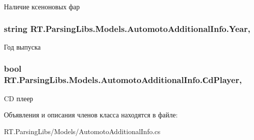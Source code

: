 Наличие ксеноновых фар 

\hypertarget{class_r_t_1_1_parsing_libs_1_1_models_1_1_automoto_additional_info_ae0f5daa4045a2596ba9836508e58fb6d}{
\subsubsection[{Year}]{\setlength{\rightskip}{0pt plus 5cm}string R\+T.\+Parsing\+Libs.\+Models.\+Automoto\+Additional\+Info.\+Year\hspace{0.3cm}{\ttfamily [get]}, {\ttfamily [set]}}}\label{class_r_t_1_1_parsing_libs_1_1_models_1_1_automoto_additional_info_ae0f5daa4045a2596ba9836508e58fb6d}


Год выпуска 

\hypertarget{class_r_t_1_1_parsing_libs_1_1_models_1_1_automoto_additional_info_a17c1ad5fc22043afccdf88454c171807}{
\subsubsection[{Сd\+Player}]{\setlength{\rightskip}{0pt plus 5cm}bool R\+T.\+Parsing\+Libs.\+Models.\+Automoto\+Additional\+Info.\+Сd\+Player\hspace{0.3cm}{\ttfamily [get]}, {\ttfamily [set]}}}\label{class_r_t_1_1_parsing_libs_1_1_models_1_1_automoto_additional_info_a17c1ad5fc22043afccdf88454c171807}


C\+D плеер 



Объявления и описания членов класса находятся в файле\+:\begin{DoxyCompactItemize}
\item 
R\+T.\+Parsing\+Libs/\+Models/Automoto\+Additional\+Info.\+cs\end{DoxyCompactItemize}
